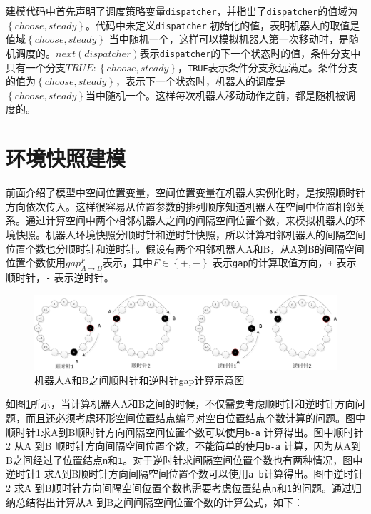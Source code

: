 建模代码中首先声明了调度策略变量\verb|dispatcher|，并指出了\verb|dispatcher|的值域为$\left\{choose,steady\right\}$。代码中未定义\verb|dispatcher| 初始化的值，表明机器人的取值是值域$\left\{choose,steady\right\}$ 当中随机一个，这样可以模拟机器人第一次移动时，是随机调度的。$next\left(dispatcher\right)$表示\verb|dispatcher|的下一个状态时的值，条件分支中只有一个分支$TRUE : \left\{choose,steady\right\}$，\verb|TRUE|表示条件分支永远满足。条件分支的值为$\left\{choose,steady\right\}$，表示下一个状态时，机器人的调度是$\left\{choose,steady\right\}$当中随机一个。这样每次机器人移动动作之前，都是随机被调度的。

\section{环境快照建模}
前面介绍了模型中空间位置变量，空间位置变量在机器人实例化时，是按照顺时针方向依次传入。这样很容易从位置参数的排列顺序知道机器人在空间中位置相邻关系。通过计算空间中两个相邻机器人之间的间隔空间位置个数，来模拟机器人的环境快照。机器人环境快照分顺时针和逆时针快照，所以计算相邻机器人的间隔空间位置个数也分顺时针和逆时针。假设有两个相邻机器人A和B，从A到B的间隔空间位置个数使用$gap_{A \rightarrow B}^F$表示，其中$F \in \left\{+,-\right\}$ 表示\verb|gap|的计算取值方向，\verb|+| 表示顺时针，\verb|-| 表示逆时针。

\begin{figure}[!hbt]
	\centering
	\includegraphics[width=6 in]{fig/gap.png}
	\caption{机器人A和B之间顺时针和逆时针gap计算示意图}
	\label{fig:gap}
\end{figure}

如图\ref{fig:gap}所示，当计算机器人A和B之间的时候，不仅需要考虑顺时针和逆时针方向问题，而且还必须考虑环形空间位置结点编号对空白位置结点个数计算的问题。图中顺时针1求A到B顺时针方向间隔空间位置个数可以使用\verb|b-a| 计算得出。图中顺时针2 从A 到B 顺时针方向间隔空间位置个数，不能简单的使用\verb|b-a| 计算，因为从A到B之间经过了位置结点\verb|n|和\verb|1|。对于逆时针求间隔空间位置个数也有两种情况，图中逆时针1 求A到B顺时针方向间隔空间位置个数可以使用\verb|a-b|计算得出。图中逆时针2 求A 到B顺时针方向间隔空间位置个数也需要考虑位置结点\verb|n|和\verb|1|的问题。通过归纳总结得出计算从A 到B之间间隔空间位置个数的计算公式，如下：

